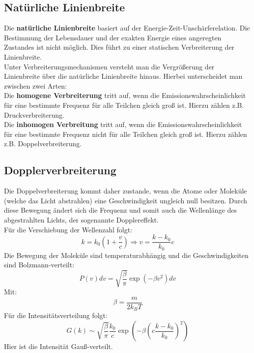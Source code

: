 \subsection{Natürliche Linienbreite}
Die \textbf{natürliche Linienbreite} basiert auf der Energie-Zeit-Unschärferelation.
Die Bestimmung der Lebensdauer und der exakten Energie eines 
angeregten Zustandes ist nicht möglich. 
Dies führt zu einer statischen Verbreiterung der Linienbreite.\\
Unter Verbreiterungsmechanismen versteht man die Vergrößerung der Linienbreite
über die natürliche Linienbreite hinaus. Hierbei unterscheidet man zwischen zwei Arten:\\
Die \textbf{homogene Verbreiterung} tritt auf, wenn die Emissionswahrscheinlichkeit für eine bestimmte Frequenz 
für alle Teilchen gleich groß ist. Hierzu zählen z.B. Druckverbreiterung.\\
Die \textbf{inhomogen Verbreitung} tritt auf, wenn die Emissionswahrscheinlichkeit für eine bestimmte Frequenz 
nicht für alle Teilchen gleich groß ist. Hierzu zählen z.B. Doppelverbreiterung.
\subsection{Dopplerverbreiterung}
Die Doppelverbreiterung kommt daher zustande, wenn die Atome oder Moleküle (welche das Licht abstrahlen) eine Geschwindigkeit ungleich null besitzen.
Durch diese Bewegung ändert sich die Frequenz und somit auch die Wellenlänge des abgestrahlten Lichts, der sogenannte Dopplereffekt.\\
Für die Verschiebung der Wellenzahl folgt:
\begin{equation}
    k=k_0\left(1+\frac{v}{c}\right) \Rightarrow v=\frac{k-k_0}{k_0}c
\end{equation}
Die Bewegung der Moleküle sind temperaturabhängig und die Geschwindigkeiten sind Bolzmann-verteilt:
\begin{equation}
    P(v)dv=\sqrt{\frac{\beta}{\pi}}\exp\left(-\beta v^2\right)dv
\end{equation} 
Mit:
\begin{equation}
    \beta=\frac{m}{2k_BT}
\end{equation}
Für die Intensitätsverteilung folgt:
\begin{equation}
    G(k)\sim\sqrt{\frac{\beta}{\pi}}\frac{k_0}{c}\exp\left(-\beta\left(c\frac{k-k_0}{k_0}\right)^2\right)
\end{equation}
Hier ist die Intensität Gauß-verteilt.\newpage

